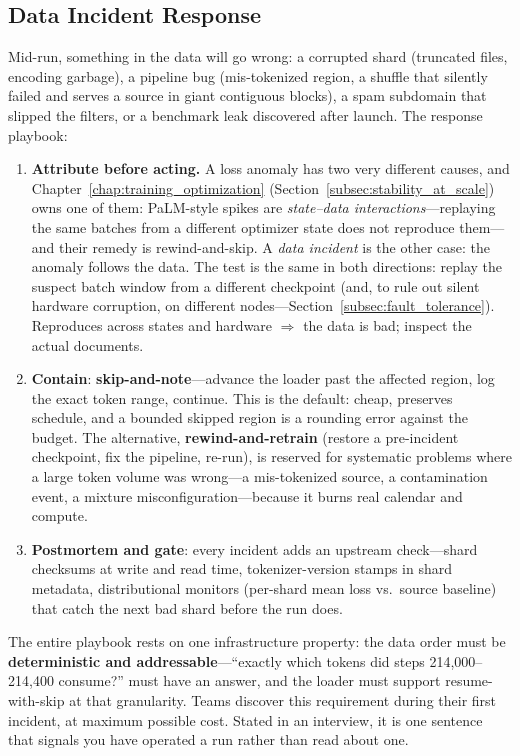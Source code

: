 \subsection{Data Incident Response}

Mid-run, something in the data will go wrong: a corrupted shard (truncated files, encoding garbage), a pipeline bug (mis-tokenized region, a shuffle that silently failed and serves a source in giant contiguous blocks), a spam subdomain that slipped the filters, or a benchmark leak discovered after launch. The response playbook:

\begin{enumerate}
    \item \textbf{Attribute before acting.} A loss anomaly has two very different causes, and Chapter~\ref{chap:training_optimization} (Section~\ref{subsec:stability_at_scale}) owns one of them: PaLM-style spikes are \textit{state--data interactions}---replaying the same batches from a different optimizer state does not reproduce them---and their remedy is rewind-and-skip. A \textit{data incident} is the other case: the anomaly follows the data. The test is the same in both directions: replay the suspect batch window from a different checkpoint (and, to rule out silent hardware corruption, on different nodes---Section~\ref{subsec:fault_tolerance}). Reproduces across states and hardware $\Rightarrow$ the data is bad; inspect the actual documents.
    \item \textbf{Contain}: \textbf{skip-and-note}---advance the loader past the affected region, log the exact token range, continue. This is the default: cheap, preserves schedule, and a bounded skipped region is a rounding error against the budget. The alternative, \textbf{rewind-and-retrain} (restore a pre-incident checkpoint, fix the pipeline, re-run), is reserved for systematic problems where a large token volume was wrong---a mis-tokenized source, a contamination event, a mixture misconfiguration---because it burns real calendar and compute.
    \item \textbf{Postmortem and gate}: every incident adds an upstream check---shard checksums at write and read time, tokenizer-version stamps in shard metadata, distributional monitors (per-shard mean loss vs.\ source baseline) that catch the next bad shard before the run does.
\end{enumerate}

\begin{keyinsight}
The entire playbook rests on one infrastructure property: the data order must be \textbf{deterministic and addressable}---``exactly which tokens did steps 214,000--214,400 consume?'' must have an answer, and the loader must support resume-with-skip at that granularity. Teams discover this requirement during their first incident, at maximum possible cost. Stated in an interview, it is one sentence that signals you have operated a run rather than read about one.
\end{keyinsight}

